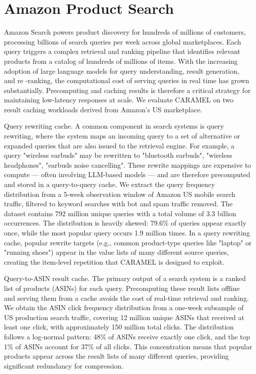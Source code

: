 \section{Amazon Product Search}

Amazon Search powers product discovery for hundreds of millions of customers, processing billions of search queries per week across 
global marketplaces. Each query triggers a complex retrieval and ranking pipeline that identifies relevant products from a catalog of 
hundreds of millions of items. With the increasing adoption of large language models for query understanding, result generation, and re
-ranking, the computational cost of serving queries in real time has grown substantially. Precomputing and caching results is therefore
a critical strategy for maintaining low-latency responses at scale. We evaluate CARAMEL on two result caching workloads derived from 
Amazon's US marketplace.

Query rewriting cache. A common component in search systems is query rewriting, where the system maps an incoming query to a set of 
alternative or expanded queries that are also issued to the retrieval engine. For example, a query "wireless earbuds" may be rewritten 
to {"bluetooth earbuds", "wireless headphones", "earbuds noise cancelling"}. These rewrite mappings are expensive to compute — often 
involving LLM-based models — and are therefore precomputed and stored in a query-to-query cache. We extract the query frequency 
distribution from a 5-week observation window of Amazon US mobile search traffic, filtered to keyword searches with bot and spam 
traffic removed. The dataset contains 792 million unique queries with a total volume of 3.3 billion occurrences. The distribution is 
heavily skewed: 79.6\% of queries appear exactly once, while the most popular query occurs 1.9 million times. In a query rewriting 
cache, popular rewrite targets (e.g., common product-type queries like "laptop" or "running shoes") appear in the value lists of many 
different source queries, creating the item-level repetition that CARAMEL is designed to exploit.

Query-to-ASIN result cache. The primary output of a search system is a ranked list of products (ASINs) for each query. Precomputing 
these result lists offline and serving them from a cache avoids the cost of real-time retrieval and ranking. We obtain the ASIN click 
frequency distribution from a one-week subsample of US production search traffic, covering 12 million unique ASINs that received at 
least one click, with approximately 150 million total clicks. The distribution follows a log-normal pattern: 48\% of ASINs receive 
exactly one click, and the top 1\% of ASINs account for 37\% of all clicks. This concentration means that popular products appear across 
the result lists of many different queries, providing significant redundancy for compression.